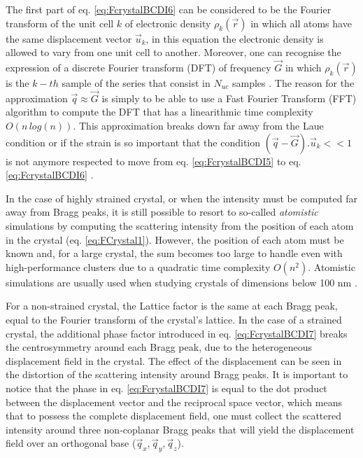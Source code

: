 The first part of eq. \ref{eq:FcrystalBCDI6} can be considered to be the Fourier transform of the unit cell $k$ of electronic density $\rho_k(\vec{r})$ in which all atoms have the same displacement vector $\vec{u}_k$, in this equation the electronic density is allowed to vary from one unit cell to another.
Moreover, one can recognise the expression of a discrete Fourier transform (DFT) of frequency $\vec{G}$ in which $\rho_k(\vec{r})$ is the $k-th$ sample of the series that consist in $N_{uc}$ samples \parencite{Cooley1965, Cochran1967, FavreNicolin2011a, Godard2021}.
The reason for the approximation $\vec{q} \approx \vec{G}$ is simply to be able to use a Fast Fourier Transform (FFT) algorithm to compute the DFT that has a linearithmic time complexity $O(n \, log(n))$.
This approximation breaks down far away from the Laue condition or if the strain is so important that the condition $(\vec{q}-\vec{G}).\vec{u}_k<<1$ is not anymore respected to move from eq. \ref{eq:FcrystalBCDI5} to eq. \ref{eq:FcrystalBCDI6} \parencite{Takagi1969}.

In the case of highly strained crystal, or when the intensity must be computed far away from Bragg peaks, it is still possible to resort to so-called \textit{atomistic} simulations by computing the scattering intensity from the position of each atom in the crystal (eq. \ref{eq:FCrystal1}).
However, the position of each atom must be known and, for a large crystal, the sum becomes too large to handle even with high-performance clusters due to a quadratic time complexity $O(n^2)$.
Atomistic simulations are usually used when studying crystals of dimensions below 100 nm \parencite{Dupraz2022}.

For a non-strained crystal, the Lattice factor is the same at each Bragg peak, equal to the Fourier transform of the crystal's lattice.
In the case of a strained crystal, the additional phase factor introduced in eq. \ref{eq:FcrystalBCDI7} breaks the centrosymmetry around each Bragg peak, due to the heterogeneous displacement field in the crystal.
The effect of the displacement can be seen in the distortion of the scattering intensity around Bragg peaks.
It is important to notice that the phase in eq. \ref{eq:FcrystalBCDI7} is equal to the dot product between the displacement vector and the reciprocal space vector, which means that to possess the complete displacement field, one must collect the scattered intensity around three non-coplanar Bragg peaks \parencite{Newton2010} that will yield the displacement field over an orthogonal base ($\vec{q}_x, \vec{q}_y, \vec{q}_z$).

